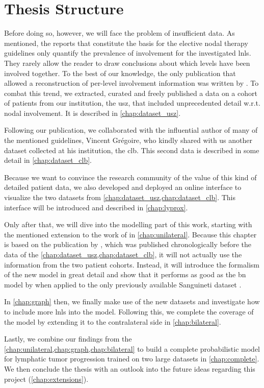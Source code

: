 \documentclass[\relativeRoot/main.tex]{subfiles}
\begin{document}
\section{Thesis Structure}
\label{sec:intro:structure}

Before doing so, however, we will face the problem of insufficient data. As mentioned, the reports that constitute the basis for the elective nodal therapy guidelines only quantify the prevalence of involvement for the investigated \glspl{lnl}. They rarely allow the reader to draw conclusions about which levels have been involved together. To the best of our knowledge, the only publication that allowed a reconstruction of per-level involvement information was written by . To combat this trend, we extracted, curated and freely published a data on a cohort of patients from our institution, the \gls{usz}, that included unprecedented detail w.r.t. nodal involvement. It is described in \cref{chap:dataset_usz}.

Following our publication, we collaborated with the influential author of many of the mentioned guidelines, Vincent Grégoire, who kindly shared with us another dataset collected at his institution, the \gls{clb}. This second data is described in some detail in \cref{chap:dataset_clb}.

Because we want to convince the research community of the value of this kind of detailed patient data, we also developed and deployed an online interface to visualize the two datasets from \cref{chap:dataset_usz,chap:dataset_clb}. This interface will be introduced and described in \cref{chap:lyprox}.

Only after that, we will dive into the modelling part of this work, starting with the mentioned extension to the work of  in \cref{chap:unilateral}. Because this chapter is based on the publication by , which was published chronologically before the data of the \cref{chap:dataset_usz,chap:dataset_clb}, it will not actually use the information from the two patient cohorts. Instead, it will introduce the formalism of the new model in great detail and show that it performs as good as the \gls{bn} model by  when applied to the only previously available Sanguineti dataset \cite{sanguineti_defining_2009}.

In \cref{chap:graph} then, we finally make use of the new datasets and investigate how to include more \glspl{lnl} into the model. Following this, we complete the coverage of the model by extending it to the contralateral side in \cref{chap:bilateral}.

Lastly, we combine our findings from the \cref{chap:unilateral,chap:graph,chap:bilateral} to build a complete probabilistic model for lymphatic tumor progression trained on two large datasets in \cref{chap:complete}. We then conclude the thesis with an outlook into the future ideas regarding this project (\cref{chap:extensions}).
\end{document}
